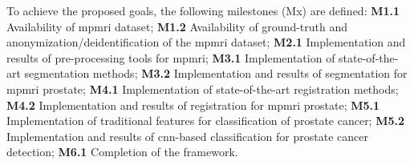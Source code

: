 To achieve the proposed goals, the following milestones (Mx) are defined:
\textbf{M1.1} Availability of \ac{mpmri} dataset;
\textbf{M1.2} Availability of ground-truth and anonymization/deidentification of the \ac{mpmri} dataset;
\textbf{M2.1} Implementation and results of pre-processing tools for \ac{mpmri};
\textbf{M3.1} Implementation of state-of-the-art segmentation methods;
\textbf{M3.2} Implementation and results of segmentation for \ac{mpmri} prostate;
\textbf{M4.1} Implementation of state-of-the-art registration methods;
\textbf{M4.2} Implementation and results of registration for \ac{mpmri} prostate;
\textbf{M5.1} Implementation of traditional features for classification of prostate cancer;
\textbf{M5.2} Implementation and results of \ac{cnn}-based classification for prostate cancer detection;
\textbf{M6.1} Completion of the framework.

